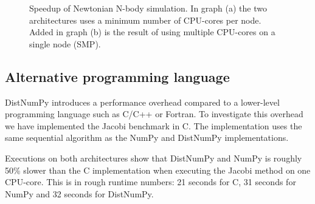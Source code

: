 \documentclass{sigplanconf}
\begin{document}
\begin{figure}%
  \begin{center}%
    \caption{Speedup of Newtonian N-body simulation. In graph (a) the two architectures uses a minimum number of CPU-cores per node. Added in graph (b) is the result of using multiple CPU-cores on a single node (SMP).}%
    \label{fig:NbodyScale}%
  \end{center}
\end{figure}


\subsection{Alternative programming language}
DistNumPy introduces a performance overhead compared to a lower-level programming language such as C/C++ or Fortran. To investigate this overhead we have implemented the Jacobi benchmark in C. The implementation uses the same sequential algorithm as the NumPy and DistNumPy implementations. 

Executions on both architectures show that DistNumPy and NumPy is roughly 50\% slower than the C implementation when executing the Jacobi method on one CPU-core. This is in rough runtime numbers: 21 seconds for C, 31 seconds for NumPy and 32 seconds for DistNumPy.
\end{document}
